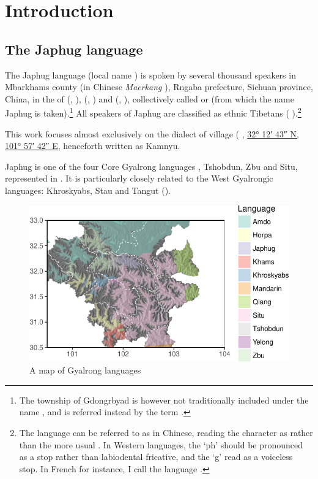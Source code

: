 \chapter{Introduction}

\section{The Japhug language}
The Japhug language (local name ) is spoken by several thousand speakers in Mbarkhams county (in Chinese \textit{Maerkang} ), Rngaba prefecture, Sichuan province, China, in the  of  (,  ),  (,  ) and  (,  ), collectively called  or  (from which the name Japhug is taken).\footnote{The township of Gdongrbyad is however not traditionally included under the name , and is referred instead by the term . }  All speakers of Japhug are classified as ethnic Tibetans ( ).\footnote{The language can be referred to as   in Chinese, reading the character  as   rather than the more usual . In Western languages, the `ph' should be pronounced as a stop rather than labiodental fricative, and the `g' read as a voiceless stop. In French for instance, I call the language . }

This work focuses almost exclusively on the dialect of  village ( , \href{https://geohack.toolforge.org/geohack.php?params=32.21181437468092_N_101.96170811415986_E}{32° 12′ 43″ N, 101° 57′ 42″ E}, henceforth written as Kamnyu.
  
Japhug is one of the four Core Gyalrong languages \citep{jackson00sidaba}, Tshobdun, Zbu and Situ, represented in . It is particularly closely related to the West Gyalrongic languages: Khroskyabs, Stau  and Tangut (\citealt{jackson00puxi, jacques17stau}).
    
 \begin{figure}
\caption{A map of Gyalrong languages} \label{fig:map.rgyalrong}
\includegraphics[width=\textwidth]{carte3.pdf}
\end{figure}

